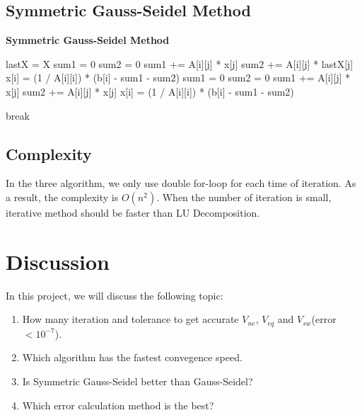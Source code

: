 \documentclass{article}
\begin{document}
\subsection{Symmetric Gauss-Seidel Method}
\begin{algorithm}[H]
    \caption{\textbf{Symmetric Gauss-Seidel Method}}
    \label{algo:sgs}
    \begin{algorithmic}
            \State lastX = X
                \State sum1 = 0
                \State sum2 = 0
                    \State sum1 += A[i][j] * x[j]
                \EndFor
                    \State sum2 += A[i][j] * lastX[j]
                \EndFor
                \State x[i] = (1 / A[i][i]) * (b[i] - sum1 - sum2)
            \EndFor
                \State sum1 = 0
                \State sum2 = 0
                    \State sum1 += A[i][j] * x[j]
                \EndFor
                    \State sum2 += A[i][j] * x[j]
                \EndFor
                \State x[i] = (1 / A[i][i]) * (b[i] - sum1 - sum2)
            \EndFor

                \State break
            \EndIf
        \EndFor
    \end{algorithmic}
\end{algorithm}

\subsection{Complexity}
\label{sec:complexity}
In the three algorithm, we only use double for-loop for each time of iteration. As a result, the complexity is $O(n^2)$. When the
number of iteration is small, iterative method should be faster than LU Decomposition.

\section{Discussion}
In this project, we will discuss the following topic:
\begin{enumerate}
    \item How many iteration and tolerance to get accurate $V_{ne}$, $V_{eq}$ and $V_{sw}$(error $< 10^{-7}$).
    \item Which algorithm has the fastest convegence speed.
    \item Is Symmetric Gauss-Seidel better than Gauss-Seidel?
	\item Which error calculation method is the best?
\end{enumerate}
\end{document}
